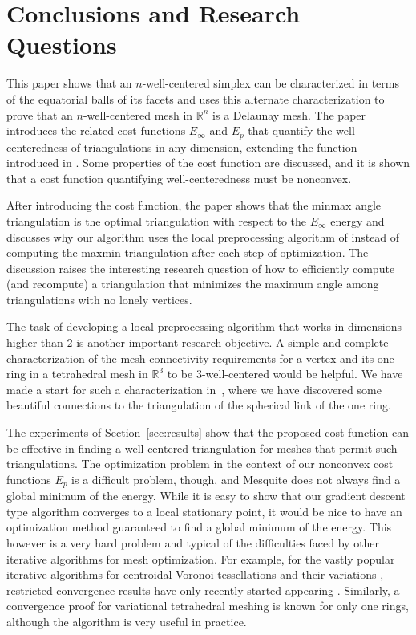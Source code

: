 \documentclass[final]{siamltex}
\newcommand{\Real}{\ensuremath{\mathbb{R}}} \newcommand{\meshM}{\ensuremath{\mathcal{M}}} \newcommand{\meshV}{\ensuremath{\mathcal{V}}} \newcommand{\meshT}{\ensuremath{\mathcal{T}}} \newcommand{\interior}{\ensuremath{\mathrm{Int}}}
\begin{document}
\section{Conclusions and Research Questions}
\label{sec:conclusions}





This paper shows that an $n$-well-centered simplex can be
characterized in terms of the equatorial balls of its facets and uses
this alternate characterization to prove that an $n$-well-centered
mesh in $\Real^{n}$ is a Delaunay mesh.  The paper introduces the
related cost functions $E_{\infty}$ and $E_{p}$ that quantify the
well-centeredness of triangulations in any dimension, extending the
function introduced in \cite{VaHiGuRa2007}.  Some properties of the
cost function are discussed, and it is shown that a cost function
quantifying well-centeredness must be nonconvex.


After introducing the cost function, the paper shows that the minmax
angle triangulation is the optimal triangulation with respect to the
$E_{\infty}$ energy and discusses why our algorithm uses the local
preprocessing algorithm of \cite{VaHiGuRa2007} instead of computing
the maxmin triangulation after each step of optimization.  The
discussion raises the interesting research question of how to
efficiently compute (and recompute)
a triangulation that minimizes the
maximum angle among triangulations with no lonely vertices.

The task
of developing a local preprocessing algorithm that works in
dimensions higher than $2$ is another important research objective.
A simple and complete characterization of the mesh connectivity
requirements for a vertex and its one-ring in a tetrahedral mesh in
$\Real^3$ to be $3$-well-centered would be helpful. We have made a
start for such a characterization in~\cite{VaHiGuRaZh2008}, where we
have discovered some beautiful connections to the triangulation of the
spherical link of the one ring.


The experiments of Section~\ref{sec:results} show that the proposed cost
function can be effective in finding a well-centered triangulation for
meshes that permit such triangulations.  The optimization problem in
the context of our nonconvex cost functions $E_{p}$ is a difficult
problem, though, and Mesquite does not always find a global minimum of
the energy. While it is easy to show that our gradient descent type
algorithm converges to a local stationary point, it would be nice to
have an optimization method guaranteed to find a global minimum of the
energy. This however is a very hard problem and typical of the
difficulties faced by other iterative algorithms for mesh
optimization. For example, for the vastly popular iterative algorithms
for centroidal Voronoi tessellations \cite{DuFaGu1999} and their
variations \cite{DuGuJu2003, DuWa2005}, restricted convergence results
have only recently started appearing
\cite{DuEmJu2006,EmJuRa2008}. Similarly, a convergence proof for
variational tetrahedral meshing \cite{AlCoYvDe2005} is known for only
one rings, although the algorithm is very useful in practice.
\end{document}
